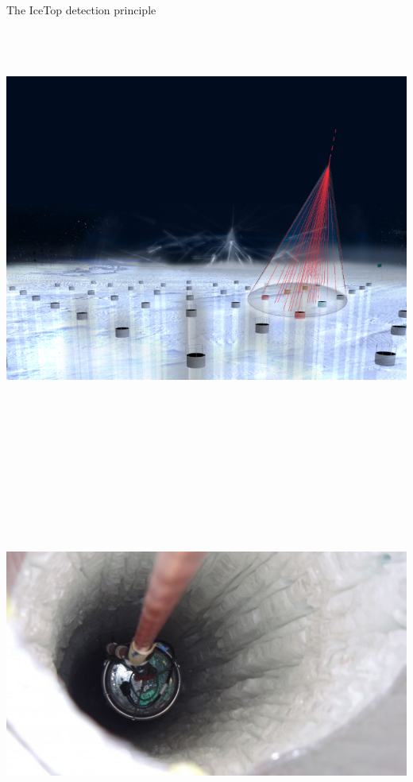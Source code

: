 \Tr
\onecolumn
\begin{center}
{\blue The IceTop detection principle}\\[5mm] 
\includegraphics[keepaspectratio,height=14cm]{cr-shower2}
\end{center}

\Tr
\onecolumn
\begin{center}
\includegraphics[keepaspectratio,height=14cm]{hole2}
\end{center}

